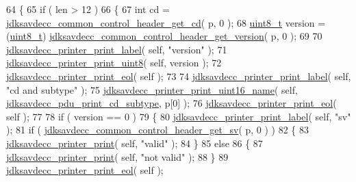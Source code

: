 \begin{DoxyCode}
64 \{
65     \textcolor{keywordflow}{if} ( len > 12 )
66     \{
67         \textcolor{keywordtype}{int} cd = \hyperlink{group__jdksavdecc__avtp__common__control__header_gafcc86a6636d8793da33a2da4995b3a15}{jdksavdecc\_common\_control\_header\_get\_cd}( p, 0 );
68         \hyperlink{stdint_8h_aba7bc1797add20fe3efdf37ced1182c5}{uint8\_t} version = (\hyperlink{stdint_8h_aba7bc1797add20fe3efdf37ced1182c5}{uint8\_t})
      \hyperlink{group__jdksavdecc__avtp__common__control__header_ga901a41cbf974ed959f4baaafa2a3c81d}{jdksavdecc\_common\_control\_header\_get\_version}( p, 0 );
69 
70         \hyperlink{group__util_gaf7818b24143b3c7502926a425a242ff5}{jdksavdecc\_printer\_print\_label}( \textcolor{keyword}{self}, \textcolor{stringliteral}{"version"} );
71         \hyperlink{group__util_ga00205f7730fc39a5b93655a3b18a8dc7}{jdksavdecc\_printer\_print\_uint8}( \textcolor{keyword}{self}, version );
72         \hyperlink{group__util_gacda56c9d3d24593a52c999682fa6e6e3}{jdksavdecc\_printer\_print\_eol}( \textcolor{keyword}{self} );
73 
74         \hyperlink{group__util_gaf7818b24143b3c7502926a425a242ff5}{jdksavdecc\_printer\_print\_label}( \textcolor{keyword}{self}, \textcolor{stringliteral}{"cd and subtype"} );
75         \hyperlink{group__util_ga62486d864a66773d19bbbe23cebf346a}{jdksavdecc\_printer\_print\_uint16\_name}( \textcolor{keyword}{self}, 
      \hyperlink{group__util_ga6e3c1bc9c00f03c08f1af13033015aa0}{jdksavdecc\_pdu\_print\_cd\_subtype}, p[0] );
76         \hyperlink{group__util_gacda56c9d3d24593a52c999682fa6e6e3}{jdksavdecc\_printer\_print\_eol}( \textcolor{keyword}{self} );
77 
78         \textcolor{keywordflow}{if} ( version == 0 )
79         \{
80             \hyperlink{group__util_gaf7818b24143b3c7502926a425a242ff5}{jdksavdecc\_printer\_print\_label}( \textcolor{keyword}{self}, \textcolor{stringliteral}{"sv"} );
81             \textcolor{keywordflow}{if} ( \hyperlink{group__jdksavdecc__avtp__common__control__header_ga00819aee969a77e05716ede751b99201}{jdksavdecc\_common\_control\_header\_get\_sv}( p, 0 ) )
82             \{
83                 \hyperlink{group__util_ga335ac75e0aa3fe66501b752bf9d0f90d}{jdksavdecc\_printer\_print}( \textcolor{keyword}{self}, \textcolor{stringliteral}{"valid"} );
84             \}
85             \textcolor{keywordflow}{else}
86             \{
87                 \hyperlink{group__util_ga335ac75e0aa3fe66501b752bf9d0f90d}{jdksavdecc\_printer\_print}( \textcolor{keyword}{self}, \textcolor{stringliteral}{"not valid"} );
88             \}
89             \hyperlink{group__util_gacda56c9d3d24593a52c999682fa6e6e3}{jdksavdecc\_printer\_print\_eol}( \textcolor{keyword}{self} );

\end{DoxyCode}
